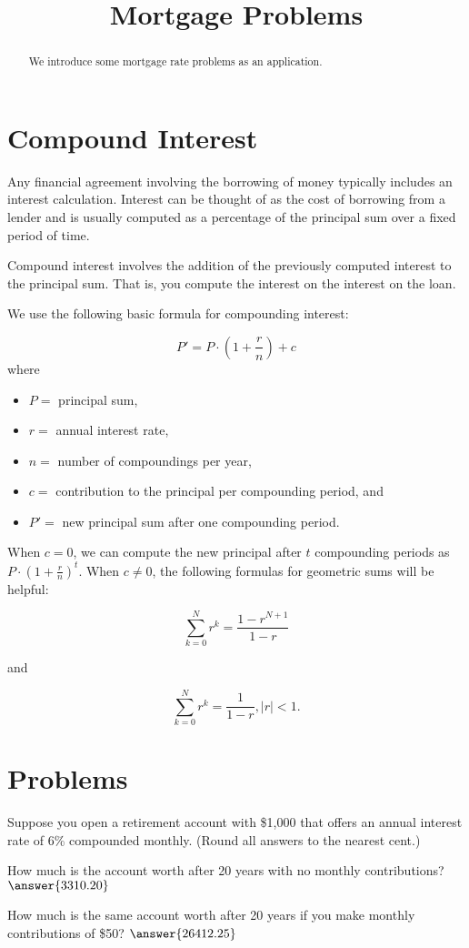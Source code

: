 \documentclass{ximera}
\title{Mortgage Problems}
\begin{document}
\begin{abstract}  
We introduce some mortgage rate problems as an application.
\end{abstract}  
\maketitle

\section{Compound Interest}

Any financial agreement involving the borrowing of money typically includes an interest calculation. Interest can be thought of as the cost of borrowing from a lender and is usually computed as a percentage of the principal sum over a fixed period of time.

Compound interest involves the addition of the previously computed interest to the principal sum. That is, you compute the interest on the interest on the loan.

We use the following basic formula for compounding interest:

$$P' = P\cdot\left(1+\frac{r}{n}\right) + c $$ where
\begin{itemize}
	\item $P = $ principal sum,
	\item $r = $ annual interest rate,
	\item $n = $ number of compoundings per year,
	\item $c = $ contribution to the principal per compounding period, and 
	\item $P' = $ new principal sum after one compounding period.
\end{itemize}

When $c=0$, we can compute the new principal after $t$ compounding periods as $P\cdot\left(1+\frac{r}{n}\right)^{t}$. When $c\neq 0$, the following formulas for geometric sums will be helpful:

$$\sum_{k=0}^N r^k = \frac{1-r^{N+1}}{1-r}$$

and

$$\sum_{k=0}^N r^k = \frac{1}{1-r}, |r| < 1.$$

\section{Problems}

\begin{question}
Suppose you open a retirement account with \$1,000 that offers an annual interest rate of 6\% compounded monthly. (Round all answers to the nearest cent.)

How much is the account worth after 20 years with no monthly contributions? $\answer{3310.20}$

How much is the same account worth after 20 years if you make monthly contributions of \$50? $\answer{26412.25}$
\end{question}
\end{document}
